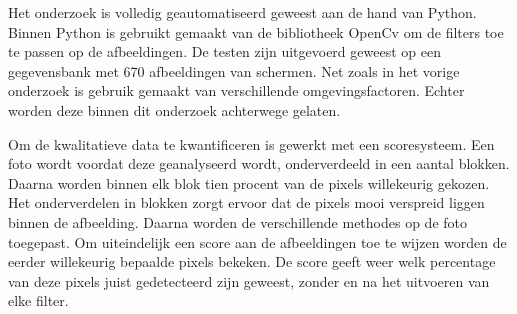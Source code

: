Het onderzoek is volledig geautomatiseerd geweest aan de hand van Python. Binnen Python is gebruikt gemaakt van de bibliotheek OpenCv om de filters toe te passen op de afbeeldingen. De testen zijn uitgevoerd geweest op een gegevensbank met 670 afbeeldingen van schermen. Net zoals in het vorige onderzoek is gebruik gemaakt van verschillende omgevingsfactoren. Echter worden deze binnen dit onderzoek achterwege gelaten. 

Om de kwalitatieve data te kwantificeren is gewerkt met een scoresysteem. Een foto wordt voordat deze geanalyseerd wordt, onderverdeeld in een aantal blokken. Daarna worden binnen elk blok tien procent van de pixels willekeurig gekozen. Het onderverdelen in blokken zorgt ervoor dat de pixels mooi verspreid liggen binnen de afbeelding. Daarna worden de verschillende methodes op de foto toegepast. Om uiteindelijk een score aan de afbeeldingen toe te wijzen worden de eerder willekeurig bepaalde pixels bekeken. De score geeft weer welk percentage van deze pixels juist gedetecteerd zijn geweest, zonder en na het uitvoeren van elke filter.
